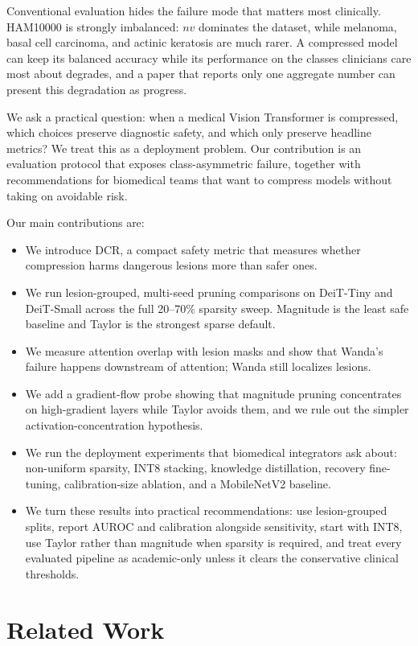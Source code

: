 \documentclass{article}
\newcommand{\nv}{\ensuremath{\textit{nv}}}
\newcommand{\DCR}{\ensuremath{\mathrm{DCR}}}
\begin{document}
Conventional evaluation hides the failure mode that matters most clinically. HAM10000 is strongly imbalanced: \nv{} dominates the dataset, while melanoma, basal cell carcinoma, and actinic keratosis are much rarer. A compressed model can keep its balanced accuracy while its performance on the classes clinicians care most about degrades, and a paper that reports only one aggregate number can present this degradation as progress.

We ask a practical question: when a medical Vision Transformer is compressed, which choices preserve diagnostic safety, and which only preserve headline metrics? We treat this as a deployment problem. Our contribution is an evaluation protocol that exposes class-asymmetric failure, together with recommendations for biomedical teams that want to compress models without taking on avoidable risk.

Our main contributions are:
\begin{itemize}[leftmargin=*,itemsep=2pt,topsep=2pt]
\item We introduce \DCR{}, a compact safety metric that measures whether compression harms dangerous lesions more than safer ones.
\item We run lesion-grouped, multi-seed pruning comparisons on DeiT-Tiny and DeiT-Small across the full 20--70\% sparsity sweep. Magnitude is the least safe baseline and Taylor is the strongest sparse default.
\item We measure attention overlap with lesion masks and show that Wanda's failure happens downstream of attention; Wanda still localizes lesions.
\item We add a gradient-flow probe showing that magnitude pruning concentrates on high-gradient layers while Taylor avoids them, and we rule out the simpler activation-concentration hypothesis.
\item We run the deployment experiments that biomedical integrators ask about: non-uniform sparsity, INT8 stacking, knowledge distillation, recovery fine-tuning, calibration-size ablation, and a MobileNetV2 baseline.
\item We turn these results into practical recommendations: use lesion-grouped splits, report AUROC and calibration alongside sensitivity, start with INT8, use Taylor rather than magnitude when sparsity is required, and treat every evaluated pipeline as academic-only unless it clears the conservative clinical thresholds.
\end{itemize}

\section{Related Work}
\end{document}
